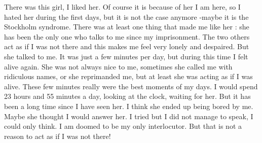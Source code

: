 \documentclass[a4paper]{article}
\begin{document}
There was this girl, I liked her. Of course it is because of her I am here, so I hated her during the first days, but it is not the case anymore -maybe it is the Stockholm syndrome. There was at least one thing that made me like her : she has been the only one who talks to me since my imprisonment. The two others act as if I was not there and this makes me feel very lonely and despaired. But she talked to me. It was just a few minutes per day, but during this time I felt alive again. She was not always nice to me, sometimes she called me with ridiculous names, or she reprimanded me, but at least she was acting as if I was alive. These few minutes really were the best moments of my days. I would spend 23 hours and 55 minutes a day, looking at the clock, waiting for her. But it has been a long time since I have seen her. I think she ended up being bored by me. Maybe she thought I would answer her. I tried but I did not manage to speak, I could only think. I am doomed to be my only interlocutor. But that is not a reason to act as if I was not there!\\
\\
\end{document}

